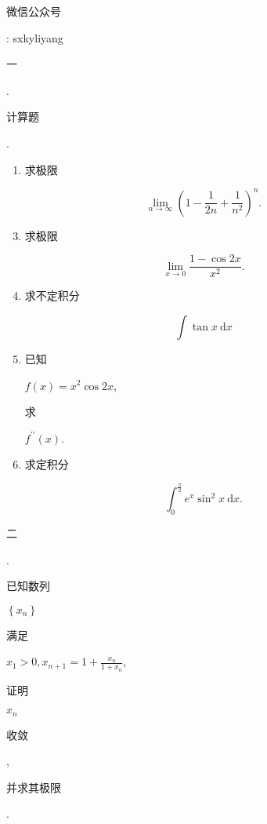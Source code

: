 \documentclass[10pt]{article}
\begin{document}
\begin{CJK}{UTF8}{mj}微信公众号\end{CJK}: sxkyliyang

\begin{CJK}{UTF8}{mj}一\end{CJK}. \begin{CJK}{UTF8}{mj}计算题\end{CJK}.

\begin{enumerate}
  \item \begin{CJK}{UTF8}{mj}求极限\end{CJK}
\end{enumerate}
$$
\lim _{n \rightarrow \infty}\left(1-\frac{1}{2 n}+\frac{1}{n^{2}}\right)^{n} .
$$

\begin{enumerate}
  \setcounter{enumi}{2}
  \item \begin{CJK}{UTF8}{mj}求极限\end{CJK}
\end{enumerate}
$$
\lim _{x \rightarrow 0} \frac{1-\cos 2 x}{x^{2}} .
$$

\begin{enumerate}
  \setcounter{enumi}{3}
  \item \begin{CJK}{UTF8}{mj}求不定积分\end{CJK}
\end{enumerate}
$$
\int \tan x \mathrm{~d} x
$$

\begin{enumerate}
  \setcounter{enumi}{4}
  \item \begin{CJK}{UTF8}{mj}已知\end{CJK} $f(x)=x^{2} \cos 2 x$, \begin{CJK}{UTF8}{mj}求\end{CJK} $f^{\prime \prime}(x)$.

  \item \begin{CJK}{UTF8}{mj}求定积分\end{CJK}

\end{enumerate}
$$
\int_{0}^{\frac{\pi}{2}} e^{x} \sin ^{2} x \mathrm{~d} x .
$$
\begin{CJK}{UTF8}{mj}二\end{CJK}. \begin{CJK}{UTF8}{mj}已知数列\end{CJK} $\left\{x_{n}\right\}$ \begin{CJK}{UTF8}{mj}满足\end{CJK} $x_{1}>0, x_{n+1}=1+\frac{x_{n}}{1+x_{n}}$, \begin{CJK}{UTF8}{mj}证明\end{CJK} $x_{n}$ \begin{CJK}{UTF8}{mj}收敛\end{CJK}, \begin{CJK}{UTF8}{mj}并求其极限\end{CJK}.
\end{document}
